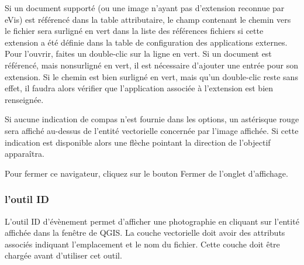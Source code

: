 Si un document supporté (ou une image n'ayant pas d'extension reconnue par eVis) est référencé dans la table attributaire, le champ contenant le chemin vers le fichier sera surligné en vert dans la liste des références fichiers si cette extension a été définie dans la table de configuration des applications externes. Pour l'ouvrir, faites un double-clic sur la ligne en vert. Si un document est référencé, mais nonsurligné en vert, il est nécessaire d'ajouter une entrée pour son extension. Si le chemin est bien surligné en vert, mais qu'un double-clic reste sans effet, il faudra alors vérifier que l'application associée à l'extension est bien renseignée.


Si aucune indication de compas n'est fournie dans les options, un astérisque rouge sera affiché au-dessus de l'entité vectorielle concernée par l'image affichée. Si cette indication est disponible alors une flèche pointant la direction de l'objectif apparaîtra.

Pour fermer ce navigateur, cliquez sur le bouton Fermer de l'onglet d'affichage.

\subsubsection{l'outil ID}\label{evis_id_tool}

L'outil ID d'évènement permet d'afficher une photographie en cliquant sur l'entité affichée dans la fenêtre de QGIS. La couche vectorielle doit avoir des attributs associés indiquant l'emplacement et le nom du fichier. Cette couche doit être chargée avant d'utiliser cet outil.
